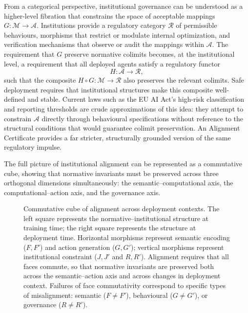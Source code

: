 \documentclass[12pt]{article}
\theoremstyle{definition}
\begin{document}
From a categorical perspective, institutional governance can be understood as a
higher-level fibration that constrains the space of acceptable mappings $G :
\mathcal{M} \to \mathcal{A}$. Institutions provide a regulatory category
$\mathcal{R}$ of permissible behaviours, morphisms that restrict or modulate
internal optimization, and verification mechanisms that observe or audit the
mappings within $\mathcal{A}$. The requirement that $G$ preserve normative
colimits becomes, at the institutional level, a requirement that all deployed
agents satisfy a regulatory functor
\begin{equation}
  H : \mathcal{A} \to \mathcal{R},
\end{equation}
such that the composite $H \circ G : \mathcal{M} \to \mathcal{R}$ also preserves
the relevant colimits. Safe deployment requires that institutional structures
make this composite well-defined and stable. Current laws such as the EU AI
Act's high-risk classification and reporting thresholds are crude approximations
of this idea: they attempt to constrain $\mathcal{A}$ directly through
behavioural specifications without reference to the structural conditions that
would guarantee colimit preservation. An Alignment Certificate provides a far
stricter, structurally grounded version of the same regulatory impulse.

The full picture of institutional alignment can be represented as a commutative
cube, showing that normative invariants must be preserved across three
orthogonal dimensions simultaneously: the semantic--computational axis, the
computational--action axis, and the governance axis.

\begin{figure}[h]
\centering
{}
\qquad\qquad
{}
\caption{Commutative cube of alignment across deployment contexts. The left
square represents the normative--institutional structure at training time;
the right square represents the structure at deployment time. Horizontal
morphisms represent semantic encoding ($F, F'$) and action generation
($G, G'$); vertical morphisms represent institutional constraint ($J, J'$
and $R, R'$). Alignment requires that all faces commute, so that normative
invariants are preserved both across the semantic--action axis and across
changes in deployment context. Failures of face commutativity correspond
to specific types of misalignment: semantic ($F \neq F'$), behavioural
($G \neq G'$), or governance ($R \neq R'$).}
\label{fig:cube}
\end{figure}
\end{document}
